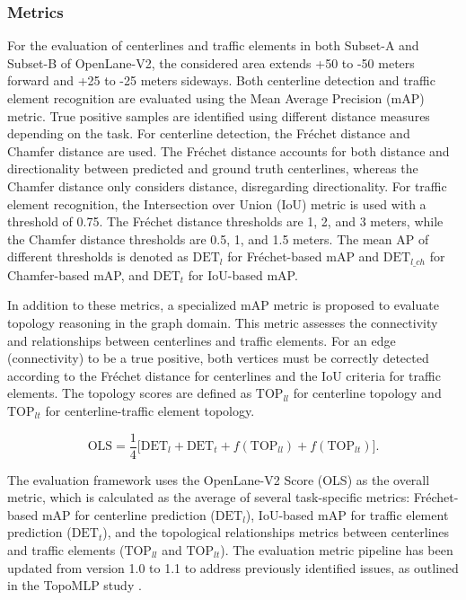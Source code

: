 \subsubsection{Metrics}

\sloppy
For the evaluation of centerlines and traffic elements in both Subset-A and Subset-B of OpenLane-V2, the considered area extends +50 to -50 meters forward and +25 to -25 meters sideways. Both centerline detection and traffic element recognition are evaluated using the Mean Average Precision (mAP) metric. True positive samples are identified using different distance measures depending on the task. For centerline detection, the Fréchet distance and Chamfer distance are used. The Fréchet distance accounts for both distance and directionality between predicted and ground truth centerlines, whereas the Chamfer distance only considers distance, disregarding directionality. For traffic element recognition, the Intersection over Union (IoU) metric is used with a threshold of 0.75. The Fréchet distance thresholds are 1, 2, and 3 meters, while the Chamfer distance thresholds are 0.5, 1, and 1.5 meters. The mean AP of different thresholds is denoted as $\text{DET}_{l}$ for Fréchet-based mAP and $\text{DET}_{l\_ch}$ for Chamfer-based mAP, and $\text{DET}_{t}$ for IoU-based mAP.

In addition to these metrics, a specialized mAP metric is proposed to evaluate topology reasoning in the graph domain. This metric assesses the connectivity and relationships between centerlines and traffic elements. For an edge (connectivity) to be a true positive, both vertices must be correctly detected according to the Fréchet distance for centerlines and the IoU criteria for traffic elements. The topology scores are defined as $\text{TOP}_{ll}$ for centerline topology and $\text{TOP}_{lt}$ for centerline-traffic element topology.


\begin{equation}
\label{Eq:OLS}
    \text{OLS} = \frac{1}{4} \bigg[ \text{DET}_{l} + \text{DET}_{t} + f(\text{TOP}_{ll}) + f(\text{TOP}_{lt}) \bigg].
\end{equation}

The evaluation framework uses the OpenLane-V2 Score (OLS) as the overall metric, which is calculated as the average of several task-specific metrics: Fréchet-based mAP for centerline prediction ($\text{DET}_{l}$), IoU-based mAP for traffic element prediction ($\text{DET}_{t}$), and the topological relationships metrics between centerlines and traffic elements ($\text{TOP}_{ll}$ and $\text{TOP}_{lt}$). The evaluation metric pipeline has been updated from version 1.0 to 1.1 to address previously identified issues, as outlined in the TopoMLP study \cite{wu2023topomlp}.

